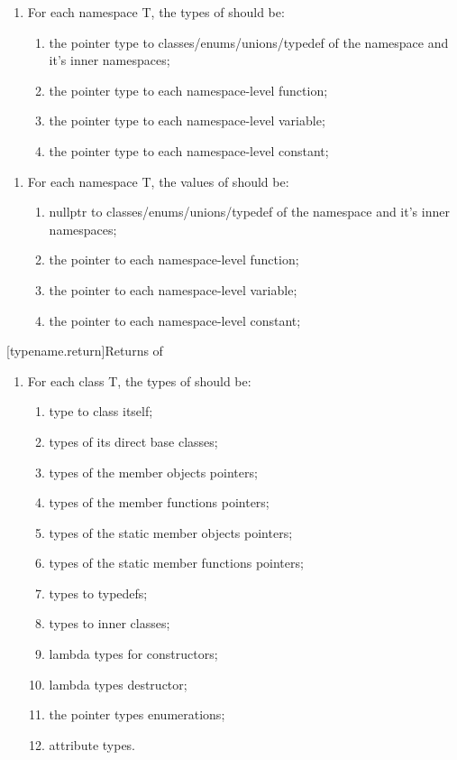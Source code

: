 \begin{enumerate}
\begin{enumerate}
\item For each namespace T, the types of  should be:
\begin{enumerate}
\item the pointer type to classes/enums/unions/typedef of the namespace and it's inner namespaces;
\item the pointer type to each namespace-level function; 
\item the pointer type to each namespace-level variable; 
\item the pointer type to each namespace-level constant; 
\end{enumerate}
\end{enumerate}

\begin{enumerate}
\item For each namespace T, the values of  should be:
\begin{enumerate}
\item nullptr to classes/enums/unions/typedef of the namespace and it's inner namespaces;
\item the pointer to each namespace-level function; 
\item the pointer to each namespace-level variable; 
\item the pointer to each namespace-level constant; 
\end{enumerate}
\end{enumerate}
\end{enumerate}

[typename.return]{Returns of  }
\begin{enumerate}
\item For each class T, the types of  should be:
\begin{enumerate}
\item type to class itself; 
\item types of its direct base classes;
\item types of the member objects pointers;
\item types of the member functions pointers; 
\item types of the static member objects pointers;
\item types of the static member functions pointers; 
\item types to typedefs;
\item types to inner classes;
\item lambda types for constructors;
\item lambda types destructor;
\item the pointer types enumerations;
\item attribute types.
\end{enumerate}
\end{enumerate}

